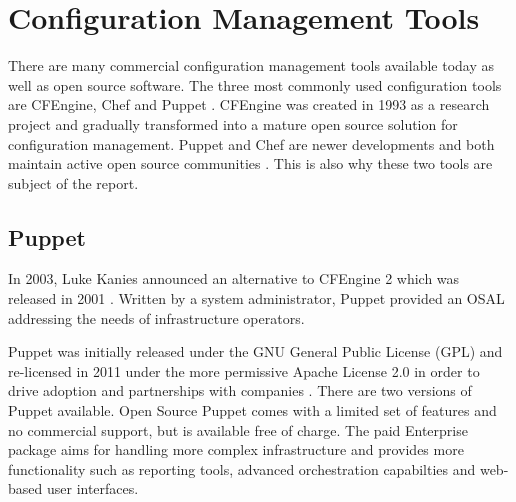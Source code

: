 \section{Configuration Management Tools}



There are many commercial configuration management tools available today as well as open source software. The three most commonly used configuration tools are CFEngine, Chef and Puppet \cite{pandey2012investigating}. CFEngine was created in 1993 as a research project and gradually transformed into a mature open source solution for configuration management\cite{Zamboni:2012:LCA:2341102}. Puppet and Chef are newer developments and both maintain active open source communities \cite{pandey2012investigating}. This is also why these two tools are subject of the report.


\subsection{Puppet}

In 2003, Luke Kanies announced an alternative to CFEngine 2 which was released in 2001 \cite{pandey2012investigating}. Written by a system administrator, Puppet provided an OSAL \cite{kanies2006puppet} addressing the needs of infrastructure operators.

Puppet was initially released under the GNU General Public License (GPL) and re-licensed in 2011 under the more permissive Apache License 2.0 in order to drive adoption and partnerships with companies \cite{puppetcomapache}. There are two versions of Puppet available. Open Source Puppet comes with a limited set of features and no commercial support, but is available free of charge. The paid Enterprise package aims for handling more complex infrastructure and provides more functionality such as reporting tools, advanced orchestration capabilties and web-based user interfaces\cite{puppetcomenterprise}.


